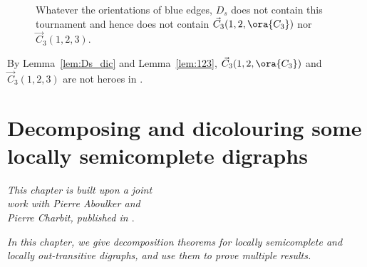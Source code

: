 \begin{figure}[ht]
\begin{center}
\end{center}
\caption{\label{fig:123} Whatever the orientations of blue edges, $D_s$ does not contain this tournament and hence does not contain $\vec C_{3}(1,2,\ora{C_3})$ nor $\vec C_{3}(1,2,3)$.}

\end{figure}

By Lemma~\ref{lem:Ds_dic} and Lemma~\ref{lem:123}, $\vec C_{3}(1,2,\ora{C_3})$ and $\vec C_{3}(1,2,3)$ are not heroes in \omgs. 

\chapter{Decomposing and dicolouring some locally semicomplete digraphs}\label{chpt:semiround}

\begin{flushright}{\slshape    
This chapter is built upon a joint \\
work with Pierre Aboulker and \\
Pierre Charbit, published in \cite{AAC21}}. \\ \medskip
\end{flushright}

\emph{In this chapter, we give decomposition theorems for locally semicomplete and locally out-transitive digraphs, and use them to prove multiple results.}

